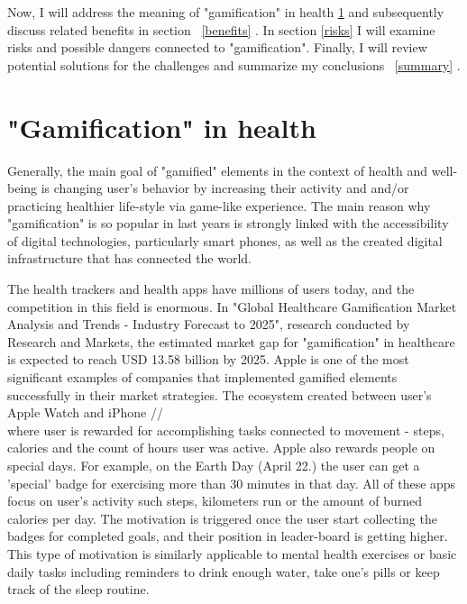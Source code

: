 \documentclass[10pt,oneside,english,coursepaper]{article}
\begin{document}
Now, I will address the meaning of "gamification" in health \ref{G-i-H} and subsequently discuss related benefits in section ~\ref{benefits} . In section \ref{risks} I will examine risks and possible dangers connected to "gamification". Finally, I will review potential solutions for the challenges and summarize my conclusions ~\ref{summary} .

%
%
%

\section{"Gamification" in health} \label{G-i-H}
Generally, the main goal of "gamified" elements in the context of health and well-being is changing user's behavior by increasing their activity and and/or practicing healthier life-style via game-like experience. The main reason why "gamification" is so popular in last years is strongly linked with the accessibility of digital technologies, particularly smart phones, as well as the created digital infrastructure\cite{Ethics} that has connected the world. 

The health trackers and health apps have millions of users today, and the competition in this field is enormous. In "Global Healthcare Gamification Market Analysis and Trends - Industry Forecast to 2025", research conducted by Research and Markets, the estimated market gap for "gamification" in healthcare is expected to reach USD 13.58 billion by 2025. \cite{mgap}   Apple is one of the most significant examples of companies that implemented gamified elements successfully in their market strategies. The ecosystem created between user's Apple Watch and iPhone //\\ where user is rewarded for accomplishing tasks connected to movement - steps, calories and the count of hours user was active.  Apple also rewards people on special days. For example, on the Earth Day (April 22.) the user can get a 'special' badge for exercising more than 30 minutes in that day\cite{earthDay}. All of these apps focus on user's activity such steps, kilometers run or the amount of burned calories per day. The motivation is triggered once the user start collecting the badges for completed goals, and their position in leader-board is getting higher. This type of motivation is similarly applicable to mental health exercises or basic daily tasks including reminders to drink enough water, take one's pills or keep track of the sleep routine.

%
%
%
\end{document}
